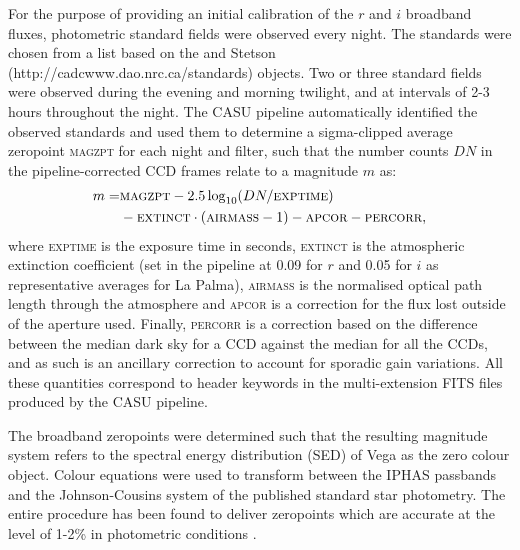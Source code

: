 \documentclass[useAMS,usenatbib]{mn2e}
\begin{document}
For the purpose of providing an initial calibration 
of the $r$ and $i$ broadband fluxes,
photometric standard fields were observed every night.
The standards were chosen from a list based on 
the \cite{Landolt1992} and Stetson (http://cadcwww.dao.nrc.ca/standards) 
objects.
Two or three standard fields were observed 
during the evening and morning twilight,
and at intervals of 2-3 hours throughout the night.
The CASU pipeline automatically identified the observed standards 
and used them to determine a sigma-clipped average zeropoint \textsc{magzpt}
for each night and filter,
such that the number counts $DN$ 
in the pipeline-corrected CCD frames
relate to a magnitude $m$ as:
\begin{equation}
\begin{split}
   m  = & \textsc{magzpt} - 2.5 \log_{10}( DN / \textsc{exptime} ) \\
 &  - \textsc{extinct}\cdot(\textsc{airmass}-1) - \textsc{apcor} - \textsc{percorr},
\label{eqn:mag}
\end{split}
\end{equation}
where \textsc{exptime} is the exposure time in seconds,
\textsc{extinct} is the atmospheric extinction coefficient 
(set in the pipeline at 0.09 for $r$ and 0.05 for $i$ as representative
averages for La Palma),
\textsc{airmass} is the normalised optical path length 
through the atmosphere and
\textsc{apcor} is a correction for the flux
lost outside of the aperture used.
Finally, \textsc{percorr} is a correction based on the difference
between the median dark sky for a CCD against the median for all the CCDs, 
and as such is an ancillary correction 
to account for sporadic gain variations. 
All these quantities correspond to header keywords in the 
multi-extension FITS files produced by the CASU pipeline.

The broadband zeropoints were determined such that the resulting magnitude system
refers to the spectral energy distribution (SED) of Vega 
as the zero colour object. 
Colour equations were used to transform between the IPHAS passbands 
and the Johnson-Cousins system 
of the published standard star photometry.
The entire procedure has been found to deliver zeropoints which 
are accurate at the level of 1-2\% 
in photometric conditions \citep{Gonzalez-Solares2011}.
\end{document}
